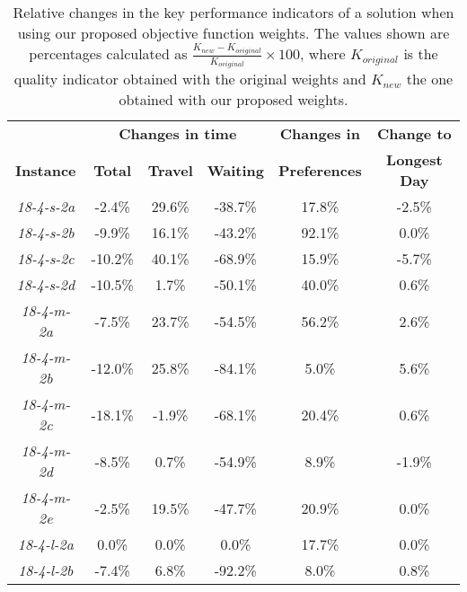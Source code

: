 \begin{table}[htbp!]
    \centering
    \caption{Relative changes in the key performance indicators of a solution when using our proposed objective function weights. The values shown are percentages calculated as $\frac{K_{new} - K_{original}}{K_{original}}\times 100$, where $K_{original}$ is the quality indicator obtained with the original weights and $K_{new}$ the one obtained with our proposed weights.}
    \begin{tabular}{cccccc}
    \toprule
   &   \multicolumn{3}{c}{\textbf{Changes in time}}   &   \textbf{Changes in}    &   \textbf{Change to}    \\
   \textbf{Instance}    &   \textbf{Total} &   \textbf{Travel}    &   \textbf{Waiting}   &   \textbf{Preferences}    &   \textbf{Longest Day}    \\
   \midrule
\emph{18-4-s-2a}    &   -2.4\%   &   29.6\%   &   -38.7\%  &   17.8\%   &   -2.5\%   \\
\emph{18-4-s-2b}    &   -9.9\%   &   16.1\%   &   -43.2\%  &   92.1\%   &   0.0\%    \\
\emph{18-4-s-2c}    &   -10.2\%  &   40.1\%   &   -68.9\%  &   15.9\%   &   -5.7\%   \\
\emph{18-4-s-2d}    &   -10.5\%  &   1.7\%    &   -50.1\%  &   40.0\%   &   0.6\%    \\
\emph{18-4-m-2a}    &   -7.5\%   &   23.7\%   &   -54.5\%  &   56.2\%   &   2.6\%    \\
\emph{18-4-m-2b}    &   -12.0\%  &   25.8\%   &   -84.1\%  &   5.0\%    &   5.6\%    \\
\emph{18-4-m-2c}    &   -18.1\%  &   -1.9\%   &   -68.1\%  &   20.4\%   &   0.6\%    \\
\emph{18-4-m-2d}    &   -8.5\%   &   0.7\%    &   -54.9\%  &   8.9\%    &   -1.9\%   \\
\emph{18-4-m-2e}    &   -2.5\%   &   19.5\%   &   -47.7\%  &   20.9\%   &   0.0\%    \\
\emph{18-4-l-2a}    &   0.0\%    &   0.0\%    &   0.0\%    &   17.7\%   &   0.0\%    \\
\emph{18-4-l-2b}    &   -7.4\%   &   6.8\%    &   -92.2\%  &   8.0\%    &   0.8\%    \\

\end{tabular}
\end{table}
